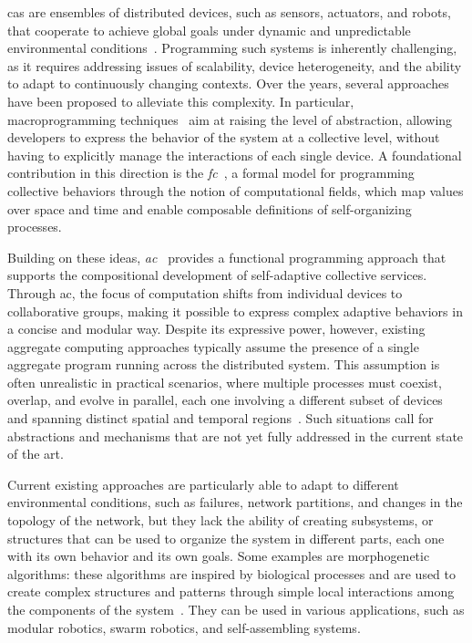 \documentclass[runningheads]{llncs}
\begin{document}
    \ac{cas} are ensembles of distributed devices, such as sensors, actuators, and robots,
    that cooperate to achieve global goals under dynamic and unpredictable environmental conditions~\cite{DBLP:conf/huc/Ferscha15}.
    Programming such systems is inherently challenging,
    as it requires addressing issues of scalability, device heterogeneity,
    and the ability to adapt to continuously changing contexts.
    Over the years,
    several approaches have been proposed to alleviate this complexity.
    In particular,
    macroprogramming techniques~\cite{casadei22} aim at raising the level of abstraction,
    allowing developers to express the behavior of the system at a collective level,
    without having to explicitly manage the interactions of each single device.
    A foundational contribution in this direction is the \emph{\ac{fc}}~\cite{JLAMP2019,TOCL2019},
    a formal model for programming collective behaviors through the notion of computational fields,
    which map values over space and time and enable composable definitions of self-organizing processes.

    Building on these ideas,
    \emph{\ac{ac}}~\cite{BealIEEEComputer2015} provides a functional programming approach that supports the compositional development of self-adaptive collective services.
    Through \ac{ac},
    the focus of computation shifts from individual devices to collaborative groups,
    making it possible to express complex adaptive behaviors in a concise and modular way.
    Despite its expressive power,
    however,
    existing aggregate computing approaches typically assume the presence of a single aggregate program running across the distributed system.
    This assumption is often unrealistic in practical scenarios,
    where multiple processes must coexist,
    overlap,
    and evolve in parallel,
    each one involving a different subset of devices and spanning distinct spatial and temporal regions~\cite{EAAI2020-processes}.
    Such situations call for abstractions and mechanisms that are not yet fully addressed in the current state of the art.

    Current existing approaches are particularly able to adapt to different environmental conditions,
    such as failures, network partitions, and changes in the topology of the network,
    but they lack the ability of creating subsystems, or structures that can be used to organize the system in different parts,
    each one with its own behavior and its own goals.
    Some examples are morphogenetic algorithms:
    these algorithms are inspired by biological processes and are used to create complex structures and patterns
    through simple local interactions among the components of the system~\cite{DBLP:books/daglib/p/Beal12,DBLP:conf/gecco/MorganC13,DBLP:conf/gecco/ZahadatHS17}.
    They can be used in various applications, such as modular robotics, swarm robotics, and self-assembling systems.
\end{document}
